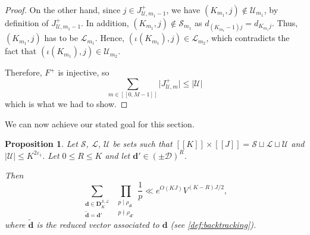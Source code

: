 \documentclass[11pt]{amsart}
\newtheorem{proposition}[theorem]{Proposition}
\theoremstyle{definition}
\renewcommand{\leq}{\leqslant}
\newcommand{\interval}[2]{[\![#1,#2]\!] }
\newcommand{\sinterval}[1]{[\![#1]\!] }
\newcommand{\abs}[1]{\left|#1\right|}
\newcommand{\eps}{\varepsilon}
\newcommand{\D}{\mathcal{D}}
\renewcommand{\d}{\boldsymbol{d}}
\newcommand{\pcomp}[2]{d_{#1#2}}
\newcommand{\cstU}{2\eps_1}
\newcommand{\curlyL}{V}
\newcommand{\fprod}[1]{\rho_{#1}}
\newcommand{\pall}{\fprod{\d}}
\newcommand{\pallprime}{\fprod{\d'}}
\newcommand{\lit}{\mathcal{L}}
\newcommand{\unlit}{\mathcal{U}}
\newcommand{\s}{\mathcal{S}}
\newcommand{\fancyD}{\mathbf{D}}
\newcommand{\Dss}{\fancyD^{\s,\lit}_{\!\repK}}
\newcommand{\repR}{J}
\newcommand{\repK}{K}
\newcommand{\newK}{\sinterval{K}}
\newcommand{\newR}{\sinterval{J}}
\newcommand{\Redd}{\widetilde{\d}}
\newcommand{\newerKR}{\newK\times\newR}
\newcommand{\tupsize}{R}
\newcommand{\myfunction}{\iota}
\begin{document}
\begin{proof}
On the other hand, since $j\in J_{\unlit,m_1-1}^+$, we have $(\repK_{m_1},j) \not\in \unlit_{m_1}$, by definition of $J_{\unlit,m_1-1}^+$. In addition, $(\repK_{m_1},j) \not\in \s_{m_1}$ as $\pcomp{(\repK_{m_1}-1)}{j} = \pcomp{\repK_{m_1}}{j}$. Thus, $(\repK_{m_1},j)$ has to be $\lit_{m_1}$. Hence, $(\myfunction(\repK_{m_1}),j)\in \lit_{m_2}$, which contradicts the fact that $(\myfunction(\repK_{m_1}),j)\in \unlit_{m_2}$. 

Therefore, $F^+$ is injective, so 	
\begin{equation*}
	\sum_{m\in \interval{0}{M-1}} \lvert{J_{\unlit,m}^+}\rvert \leq \abs{\unlit}
\end{equation*}
which is what we had to show.
\end{proof}

We can now achieve our stated goal for this section.
\begin{proposition}
\label{lem:backtrackingreconstruction}
Let $\s$, $\lit$, $\unlit$ be sets such that $\newerKR = \s\sqcup\lit\sqcup\unlit$ and $|\unlit| \leq\repK^{\cstU}$. Let $0\leq \tupsize \leq \repK$ and let $\d'\in (\pm \D)^{\tupsize}$.

Then
\begin{equation*}
	\sum_{\substack{\d\in \Dss\\ \Redd = \d'}}\, \prod_{\substack{p\mid \pall \\ p\nmid \pallprime}} \frac{1}{p} \ll e^{O(\repK\repR)} \curlyL^{(\repK-\tupsize)\repR/2},
\end{equation*}
where $\Redd$ is the reduced vector associated to $\d$ (see \cref{def:backtracking}).
\end{proposition}
\end{document}

